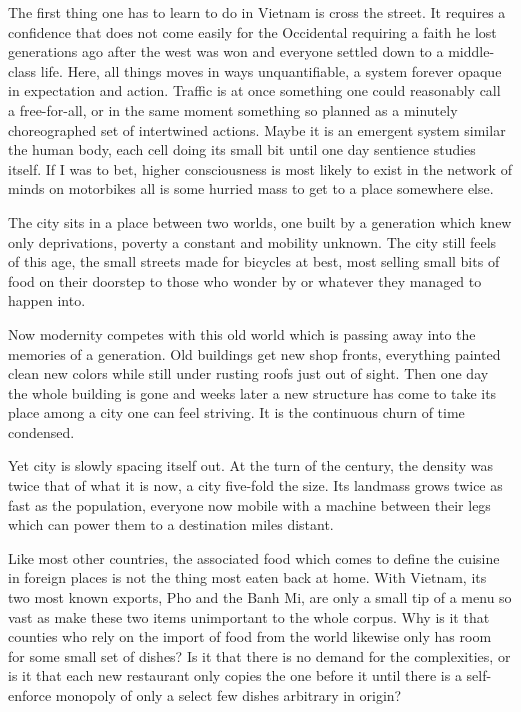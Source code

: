 \documentclass[ebook, 10pt, openright, onecolumn]{memoir}
\newcommand*\td[1]{
  \todo[inline]{
     #1 
  }
}
\newcommand*\finish{\td{ ----- Finish this section -----}}
\begin{document}
The first thing one has to learn to do in Vietnam is cross the street.  It
requires a confidence that does not come easily for the Occidental requiring a
faith he lost generations ago after the west was won and everyone settled down
to a middle-class life.  Here, all things moves in ways unquantifiable, a system
forever opaque in expectation and action.  Traffic is at once something one
could reasonably call a free-for-all, or in the same moment something so planned
as a minutely choreographed set of intertwined actions.  Maybe it is an emergent
system similar the human body, each cell doing its small bit until one day
sentience studies itself.  If I was to bet, higher consciousness is most likely
to exist in the network of minds on motorbikes all is some hurried mass to get
to a place somewhere else.

The city sits in a place between two worlds, one built by a generation which
knew only deprivations, poverty a constant and mobility unknown.  The city still
feels of this age, the small streets made for bicycles at best, most selling
small bits of food on their doorstep to those who wonder by or whatever they
managed to happen into.

Now modernity competes with this old world which is passing away into the
memories of a generation.  Old buildings get new shop fronts, everything painted
clean new colors while still under rusting roofs just out of sight.  Then one
day the whole building is gone and weeks later a new structure has come to take
its place among a city one can feel striving.  It is the continuous churn of
time condensed.

Yet city is slowly spacing itself out.  At the turn of the century, the density
was twice that of what it is now, a city five-fold the size.  Its landmass grows
twice as fast as the population, everyone now mobile with a machine between
their legs which can power them to a destination miles distant.

\finish{}

Like most other countries, the associated food which comes to define the cuisine
in foreign places is not the thing most eaten back at home. With Vietnam, its
two most known exports, Pho and the Banh Mi, are only a small tip of a menu so
vast as make these two items unimportant to the whole corpus.  Why is it that
counties who rely on the import of food from the world likewise only has room
for some small set of dishes?  Is it that there is no demand for the
complexities, or is it that each new restaurant only copies the one before it
until there is a self-enforce monopoly of only a select few dishes arbitrary in
origin?
\end{document}
